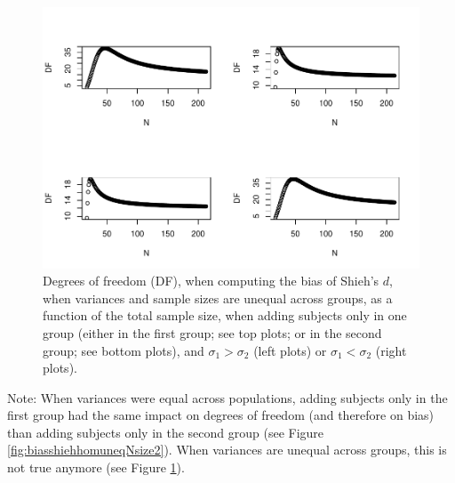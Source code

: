 \documentclass[
  english,
  man,mask]{apa6}
\begin{document}
\begin{figure}
\centering
\includegraphics{Theoretical-Bias-of-all-estimators-as-a-function-of-population-parameters_files/figure-latex/biasshiehhetuneqNsize2-1.pdf}
\caption{\label{fig:biasshiehhetuneqNsize2}Degrees of freedom (DF), when computing the bias of Shieh's \(d\), when variances and sample sizes are unequal across groups, as a function of the total sample size, when adding subjects only in one group (either in the first group; see top plots; or in the second group; see bottom plots), and \(\sigma_1 > \sigma_2\) (left plots) or \(\sigma_1 < \sigma_2\) (right plots).}
\end{figure}

Note: When variances were equal across populations, adding subjects only in the first group had the same impact on degrees of freedom (and therefore on bias) than adding subjects only in the second group (see Figure \ref{fig:biasshiehhomuneqNsize2}). When variances are unequal across groups, this is not true anymore (see Figure \ref{fig:biasshiehhetuneqNsize2}).
\end{document}
